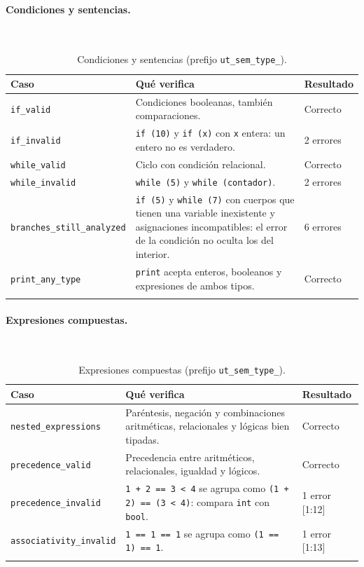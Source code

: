 \documentclass[12pt,letterpaper]{article}
\begin{document}
\paragraph{Condiciones y sentencias.}\mbox{}\\[0.3em]
\begin{longtable}{|p{5.2cm}|p{7.6cm}|p{3.4cm}|}
\hline
\textbf{Caso} & \textbf{Qué verifica} & \textbf{Resultado} \\ \hline \endhead
\footnotesize\texttt{if\_valid} & \small Condiciones booleanas, también comparaciones. & \small Correcto \\ \hline
\footnotesize\texttt{if\_invalid} & \small \texttt{if (10)} y \texttt{if (x)} con \texttt{x} entera: un entero no es verdadero. & \small 2 errores \\ \hline
\footnotesize\texttt{while\_valid} & \small Ciclo con condición relacional. & \small Correcto \\ \hline
\footnotesize\texttt{while\_invalid} & \small \texttt{while (5)} y \texttt{while (contador)}. & \small 2 errores \\ \hline
\footnotesize\texttt{branches\_still\_analyzed} & \small \texttt{if (5)} y \texttt{while (7)} con cuerpos que tienen una variable inexistente y asignaciones incompatibles: el error de la condición no oculta los del interior. & \small 6 errores \\ \hline
\footnotesize\texttt{print\_any\_type} & \small \texttt{print} acepta enteros, booleanos y expresiones de ambos tipos. & \small Correcto \\ \hline
\caption{Condiciones y sentencias (prefijo \texttt{ut\_sem\_type\_}).}
\end{longtable}
\paragraph{Expresiones compuestas.}\mbox{}\\[0.3em]
\begin{longtable}{|p{5.2cm}|p{7.6cm}|p{3.4cm}|}
\hline
\textbf{Caso} & \textbf{Qué verifica} & \textbf{Resultado} \\ \hline \endhead
\footnotesize\texttt{nested\_expressions} & \small Paréntesis, negación y combinaciones aritméticas, relacionales y lógicas bien tipadas. & \small Correcto \\ \hline
\footnotesize\texttt{precedence\_valid} & \small Precedencia entre aritméticos, relacionales, igualdad y lógicos. & \small Correcto \\ \hline
\footnotesize\texttt{precedence\_invalid} & \small \texttt{1 + 2 == 3 < 4} se agrupa como \texttt{(1 + 2) == (3 < 4)}: compara \texttt{int} con \texttt{bool}. & \small 1 error [1:12] \\ \hline
\footnotesize\texttt{associativity\_invalid} & \small \texttt{1 == 1 == 1} se agrupa como \texttt{(1 == 1) == 1}. & \small 1 error [1:13] \\ \hline
\caption{Expresiones compuestas (prefijo \texttt{ut\_sem\_type\_}).}
\end{longtable}
\end{document}
